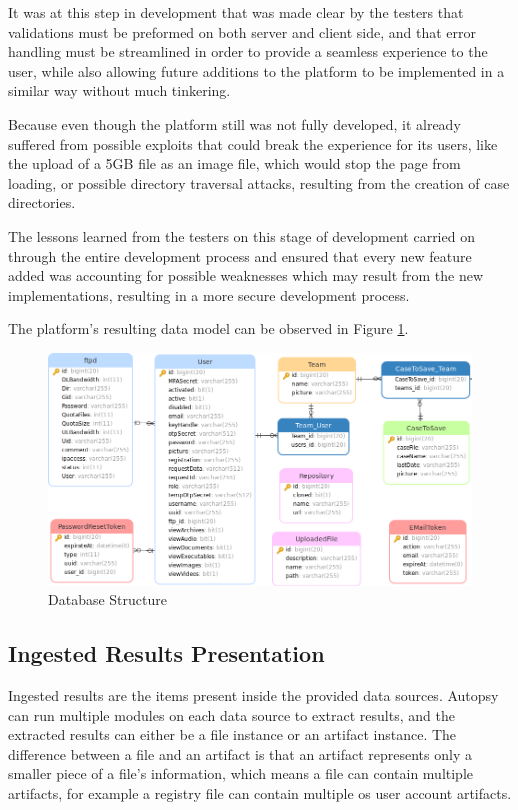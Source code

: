 It was at this step in development that was made clear by the testers that validations must be preformed on both server and client side, and that error handling must be streamlined
in order to provide a seamless experience to the user, while also allowing future additions to the platform to be implemented in a similar way without much tinkering.

Because even though the platform still was not fully developed, it already suffered from possible exploits that could break the experience for its users, like the upload of a 5GB file
as an image file, which would stop the page from loading, or possible directory traversal attacks, resulting from the creation of case directories.

The lessons learned from the testers on this stage of development carried on through the entire development process and ensured that every new feature added was accounting for possible weaknesses which may result from the new 
implementations, resulting in a more secure development process.

The platform's resulting data model can be observed in Figure \ref{fig:database}.

\begin{figure}[ht]
 \centering
 \includegraphics[width=1\linewidth]{imgs/database.png}
 \caption{Database Structure}
 \label{fig:database}
\end{figure}

\subsection{Ingested Results Presentation}

Ingested results are the items present inside the provided data sources. Autopsy can run multiple modules on each data source to extract results, and the extracted results can either be a file instance or an artifact instance.
The difference between a file and an artifact is that an artifact represents only a smaller piece of a file's information, which means a file can contain multiple artifacts, for example a registry file can contain multiple \acrshort{os} user account artifacts.

